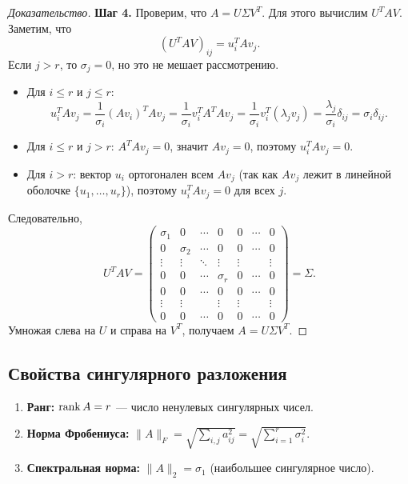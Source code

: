 \documentclass[10pt]{article}
\begin{document}
\begin{proof}[Доказательство]
    \textbf{Шаг 4.} Проверим, что $A = U \Sigma V^T$. Для этого вычислим $U^T A V$. Заметим, что
    \[
    (U^T A V)_{ij} = u_i^T A v_j.
    \]
    Если $j > r$, то $\sigma_j = 0$, но это не мешает рассмотрению.
    \begin{itemize}
        \item Для $i \le r$ и $j \le r$:
        \[
        u_i^T A v_j = \frac{1}{\sigma_i} (A v_i)^T A v_j = \frac{1}{\sigma_i} v_i^T A^T A v_j = \frac{1}{\sigma_i} v_i^T (\lambda_j v_j) = \frac{\lambda_j}{\sigma_i} \delta_{ij} = \sigma_i \delta_{ij}.
        \]
        \item Для $i \le r$ и $j > r$: $A^TA v_j = 0$, значит $A v_j = 0$, поэтому $u_i^T A v_j = 0$.
        \item Для $i > r$: вектор $u_i$ ортогонален всем $A v_j$ (так как $A v_j$ лежит в линейной оболочке $\{u_1,\dots,u_r\}$), поэтому $u_i^T A v_j = 0$ для всех $j$.
    \end{itemize}
    Следовательно,
    \[
    U^T A V = \begin{pmatrix}
    \sigma_1 & 0 & \cdots & 0 & 0 & \cdots & 0\\
    0 & \sigma_2 & \cdots & 0 & 0 & \cdots & 0\\
    \vdots & \vdots & \ddots & \vdots & \vdots & & \vdots\\
    0 & 0 & \cdots & \sigma_r & 0 & \cdots & 0\\
    0 & 0 & \cdots & 0 & 0 & \cdots & 0\\
    \vdots & \vdots & & \vdots & \vdots & & \vdots\\
    0 & 0 & \cdots & 0 & 0 & \cdots & 0
    \end{pmatrix} = \Sigma.
    \]
    Умножая слева на $U$ и справа на $V^T$, получаем $A = U \Sigma V^T$.
\end{proof}

\subsection{Свойства сингулярного разложения}

\begin{enumerate}
    \item \textbf{Ранг:} $\operatorname{rank} A = r$ — число ненулевых сингулярных чисел.
    \item \textbf{Норма Фробениуса:} $\|A\|_F = \sqrt{\sum_{i,j} a_{ij}^2} = \sqrt{\sum_{i=1}^r \sigma_i^2}$.
    \item \textbf{Спектральная норма:} $\|A\|_2 = \sigma_1$ (наибольшее сингулярное число).
\end{enumerate}
\end{document}
